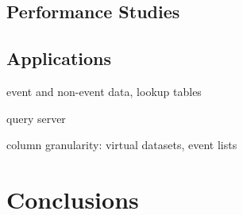 \documentclass[10pt, conference, compsocconf]{IEEEtran}
\begin{document}
\subsection{Performance Studies}

\subsection{Applications}

event and non-event data, lookup tables

query server

column granularity: virtual datasets, event lists

\section{Conclusions}



\end{document}
